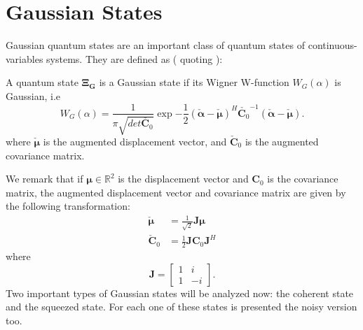\section{Gaussian States}
    \label{def:Gaussian}
    Gaussian quantum states are an important class of quantum states of continuous-variables systems.
    They are defined as (\cite{tesiGuerrini} quoting \cite{Gaussian1,Gaussian2,Gaussian3,Gaussian4,Gaussian5}):
    \begin{definition}
        A quantum state $\pmb{\Xi_G}$ is a Gaussian state if its Wigner W-function $W_G(\alpha)$
        is Gaussian, i.e
        \begin{equation}
            W_G(\alpha)=\frac{1}{\pi\sqrt{det\check{\pmb{C}_0}}}\exp{
                -\frac{1}{2}(\check{\pmb{\alpha}}-\check{\pmb{\mu}})^H
                \check{\pmb{C}_0}^{-1}(\check{\pmb{\alpha}}-\check{\pmb{\mu}})}.
        \end{equation}
        where $\check{\pmb{\mu}} $ is the augmented displacement vector, and $\check{\pmb{C}}_0$ 
        is the augmented covariance matrix. 
    \end{definition}
    
    We remark that if $\pmb{\mu} \in \mathbb{R}^2$ is the 
    displacement vector and $\pmb{C}_0$ is the covariance matrix, the augmented displacement vector
    and covariance matrix are given by the following transformation:
    \begin{equation}
        \begin{split}
            \check{\pmb{\mu}} &= \frac{1}{\sqrt{2}} \pmb{J} \pmb{\mu}\\
            \check{\pmb{C}}_0 &= \frac{1}{2} \pmb{J} \pmb{C}_0 \pmb{J}^H
        \end{split}
    \end{equation}
    where
    \begin{equation*}
        \pmb{J} = 
        \begin{bmatrix}
            1 & i\\
            1 & -i
        \end{bmatrix}.
    \end{equation*}
    Two important types of Gaussian states will be analyzed now: the coherent state and the
    squeezed state. For each one of these states is presented the noisy version too.

